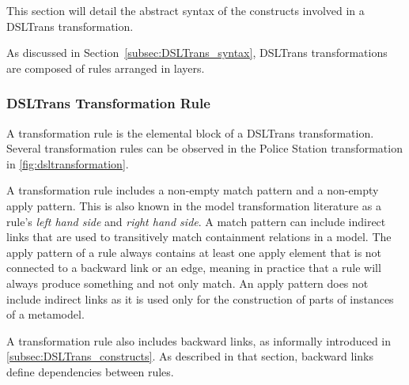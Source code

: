 This section will detail the abstract syntax of the constructs involved in a DSLTrans transformation.

As discussed in Section~\ref{subsec:DSLTrans_syntax}, DSLTrans transformations are composed of rules arranged in layers.


\subsubsection*{DSLTrans Transformation Rule}

A transformation rule is the elemental block of a DSLTrans transformation. Several transformation rules can be observed in the Police Station transformation in \cref{fig:dsltransformation}.

A transformation rule includes a non-empty match pattern and a non-empty apply pattern. This is also known in the model transformation literature as a rule's \emph{left hand side} and \emph{right hand side}. A match pattern can include indirect links that are used to transitively match containment relations in a model. The apply pattern of a rule always contains at least one apply element that is not connected to a backward link or an edge, meaning in practice that a rule will always produce something and not only match. An apply pattern does not include indirect links as it is used only for the construction of parts of instances of a metamodel.

A transformation rule also includes backward links, as informally introduced in \cref{subsec:DSLTrans_constructs}. As described in that section, backward links define dependencies between rules. 


